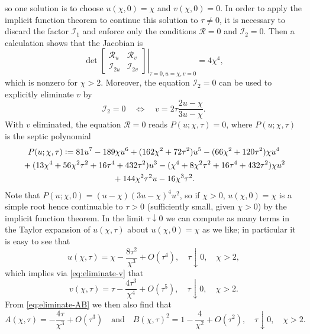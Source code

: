 so one solution is to choose $u(\chi,0)=\chi$ and $v(\chi,0)=0$.  In order to apply the implicit function theorem to continue this solution to $\tau\neq 0$, it is necessary to discard the factor $\mathcal{I}_1$ and enforce only the conditions $\mathcal{R}=0$ and $\mathcal{I}_2=0$.  Then a calculation shows that the Jacobian is
\begin{equation}
\left.\det\begin{bmatrix} \mathcal{R}_u & \mathcal{R}_v\\
\mathcal{I}_{2u} & \mathcal{I}_{2v}\end{bmatrix}\right|_{\tau=0,u=\chi,v=0}=4\chi^4,
\end{equation}
which is nonzero for $\chi>2$.  Moreover, the equation $\mathcal{I}_2=0$ can be used to explicitly eliminate $v$ by
\begin{equation}
\mathcal{I}_2=0\quad\Leftrightarrow\quad v=2\tau\frac{2u-\chi}{3u-\chi}.
\label{eq:eliminate-v}
\end{equation}
With $v$ eliminated, the equation $\mathcal{R}=0$ reads $P(u;\chi,\tau)=0$, where $P(u;\chi,\tau)$ is the septic polynomial
\begin{multline}
P(u;\chi,\tau)\vcentcolon= 81u^7-189\chi u^6 + (162\chi^2+72\tau^2)u^5-(66\chi^2+120\tau^2)\chi u^4 \\
{}+ (13\chi^4+56\chi^2\tau^2+16\tau^4+432\tau^2)u^3 -(\chi^4+8\chi^2\tau^2+16\tau^4+432\tau^2)\chi u^2 \\
{}+ 144\chi^2\tau^2u-16\chi^3\tau^2.
\end{multline}
Note that $P(u;\chi,0)=(u-\chi)(3u-\chi)^4u^2$, so if $\chi>0$, $u(\chi,0)=\chi$ is a simple root hence continuable to $\tau>0$ (sufficiently small, given $\chi>0$) by the implicit function theorem.  In the limit $\tau\downarrow 0$ we can compute as many terms in the Taylor expansion of $u(\chi,\tau)$ about $u(\chi,0)=\chi$ as we like; in particular it is easy to see that
\begin{equation}
u(\chi,\tau)=\chi -\frac{8\tau^2}{\chi^3} + O(\tau^4),\quad\tau\downarrow 0,\quad \chi>2,
\end{equation}
which implies via \eqref{eq:eliminate-v} that 
\begin{equation}
v(\chi,\tau)=\tau-\frac{4\tau^3}{\chi^4}+O(\tau^5),\quad\tau\downarrow 0,\quad\chi>2.
\end{equation}
From \eqref{eq:eliminate-AB} we then also find that
\begin{equation}
A(\chi,\tau)=-\frac{4\tau}{\chi^3}+O(\tau^3)\quad\text{and}\quad
B(\chi,\tau)^2=1-\frac{4}{\chi^2}+O(\tau^2),\quad\tau\downarrow 0,\quad \chi>2.
\label{eq:AB-tau-small}
\end{equation}
